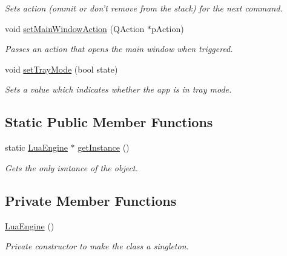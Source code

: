 \begin{DoxyCompactItemize}
\begin{DoxyCompactList}\small\item\em Sets action (ommit or don't remove from the stack) for the next command. \end{DoxyCompactList}\item 
void \hyperlink{class_lua_engine_a7b580bbf545ef24059a038769ede345e}{set\-Main\-Window\-Action} (Q\-Action $\ast$p\-Action)
\begin{DoxyCompactList}\small\item\em Passes an action that opens the main window when triggered. \end{DoxyCompactList}\item 
void \hyperlink{class_lua_engine_a9eef31895ab26f484d1ab4cc141a81fe}{set\-Tray\-Mode} (bool state)
\begin{DoxyCompactList}\small\item\em Sets a value which indicates whether the app is in tray mode. \end{DoxyCompactList}\end{DoxyCompactItemize}
\subsection*{Static Public Member Functions}
\begin{DoxyCompactItemize}
\item 
static \hyperlink{class_lua_engine}{Lua\-Engine} $\ast$ \hyperlink{class_lua_engine_aded58f5432b1e6598ad3c82ea2e5c0b4}{get\-Instance} ()
\begin{DoxyCompactList}\small\item\em Gets the only isntance of the object. \end{DoxyCompactList}\end{DoxyCompactItemize}
\subsection*{Private Member Functions}
\begin{DoxyCompactItemize}
\item 
\hyperlink{class_lua_engine_a165d91bae4bef0670afd6f73a3e7e6a7}{Lua\-Engine} ()
\begin{DoxyCompactList}\small\item\em Private constructor to make the class a singleton. \end{DoxyCompactList}\end{DoxyCompactItemize}
